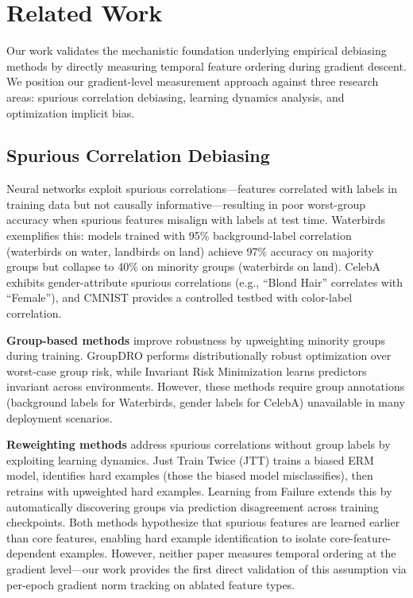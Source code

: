 \section{Related Work}

Our work validates the mechanistic foundation underlying empirical debiasing methods by directly measuring temporal feature ordering during gradient descent. We position our gradient-level measurement approach against three research areas: spurious correlation debiasing, learning dynamics analysis, and optimization implicit bias.

\subsection{Spurious Correlation Debiasing}

Neural networks exploit spurious correlations---features correlated with labels in training data but not causally informative---resulting in poor worst-group accuracy when spurious features misalign with labels at test time. Waterbirds \cite{sagawa2020distributionally} exemplifies this: models trained with 95\% background-label correlation (waterbirds on water, landbirds on land) achieve 97\% accuracy on majority groups but collapse to 40\% on minority groups (waterbirds on land). CelebA \cite{liu2015faceattributes} exhibits gender-attribute spurious correlations (e.g., ``Blond Hair'' correlates with ``Female''), and CMNIST \cite{arjovsky2019invariant} provides a controlled testbed with color-label correlation.

\textbf{Group-based methods} improve robustness by upweighting minority groups during training. GroupDRO \cite{sagawa2020distributionally} performs distributionally robust optimization over worst-case group risk, while Invariant Risk Minimization \cite{arjovsky2019invariant} learns predictors invariant across environments. However, these methods require group annotations (background labels for Waterbirds, gender labels for CelebA) unavailable in many deployment scenarios.

\textbf{Reweighting methods} address spurious correlations without group labels by exploiting learning dynamics. Just Train Twice (JTT) \cite{nam2020learning} trains a biased ERM model, identifies hard examples (those the biased model misclassifies), then retrains with upweighted hard examples. Learning from Failure \cite{liu2021just} extends this by automatically discovering groups via prediction disagreement across training checkpoints. Both methods hypothesize that spurious features are learned earlier than core features, enabling hard example identification to isolate core-feature-dependent examples. However, neither paper measures temporal ordering at the gradient level---our work provides the first direct validation of this assumption via per-epoch gradient norm tracking on ablated feature types.


